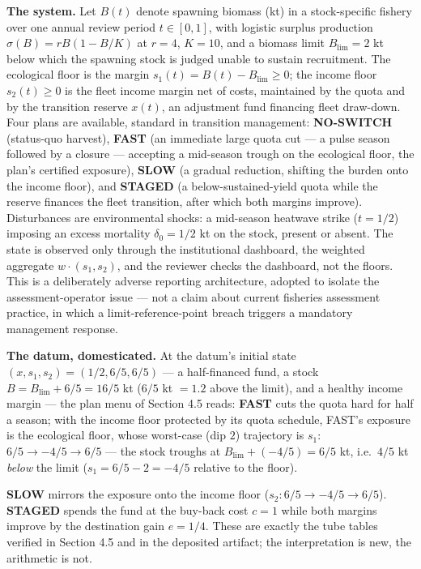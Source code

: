 \documentclass[3p,11pt]{elsarticle}
\begin{document}
\textbf{The system.} Let \(B(t)\) denote spawning biomass (kt) in a
stock-specific fishery over one annual review period \(t \in [0, 1]\), with
logistic surplus production
\(\sigma(B) = r B (1 - B/K)\) at \(r = 4\), \(K = 10\), and a biomass limit
\(B_{\mathrm{lim}} = 2\) kt below which the spawning stock is judged unable
to sustain recruitment. The ecological floor is the margin
\(s_1(t) = B(t) - B_{\mathrm{lim}} \ge 0\); the income floor
\(s_2(t) \ge 0\) is the fleet income margin net of costs, maintained by the
quota and by the transition reserve \(x(t)\), an adjustment fund financing
fleet draw-down. Four plans are available, standard in transition management:
\textbf{NO-SWITCH} (status-quo harvest), \textbf{FAST} (an immediate large
quota cut --- a pulse season followed by a closure --- accepting a
mid-season trough on the ecological floor, the plan's certified
exposure), \textbf{SLOW} (a gradual reduction, shifting the burden onto
the income floor), and \textbf{STAGED} (a
below-sustained-yield quota while the reserve finances the fleet transition,
after which both margins improve). Disturbances are environmental shocks: a
mid-season heatwave strike (\(t = 1/2\)) imposing an excess mortality
\(\delta_0 = 1/2\) kt on the stock, present or absent. The state is observed
only through the institutional dashboard, the weighted aggregate
\(w \cdot (s_1, s_2)\), and the reviewer checks the dashboard, not the
floors. This is a deliberately adverse reporting architecture, adopted to
isolate the assessment-operator issue --- not a claim about current
fisheries assessment practice, in which a limit-reference-point breach
triggers a mandatory management response.

\textbf{The datum, domesticated.} At the datum's initial state
\((x, s_1, s_2) = (1/2, 6/5, 6/5)\) --- a half-financed fund, a stock
\(B = B_{\mathrm{lim}} + 6/5 = 16/5\) kt (\(6/5\) kt \(= 1.2\) above the limit), and a
healthy income margin --- the plan menu of Section 4.5 reads: \textbf{FAST}
cuts the quota hard for half a season; with the income floor protected by its
quota schedule, FAST's exposure is the ecological floor, whose worst-case
(dip \(2\)) trajectory is \(s_1\): \(6/5 \to -4/5 \to 6/5\) --- the stock
troughs at \(B_{\mathrm{lim}} + (-4/5) = 6/5\) kt, i.e.\ \(4/5\) kt
\emph{below} the limit (\(s_1 = 6/5 - 2 = -4/5\) relative to the floor).

\textbf{SLOW} mirrors the exposure onto the income floor
(\(s_2: 6/5 \to -4/5 \to 6/5\)). \textbf{STAGED} spends the fund at the
buy-back cost \(c = 1\) while both margins improve by the destination gain
\(e = 1/4\). These are exactly the tube tables verified in Section 4.5 and
in the deposited artifact; the interpretation is new, the arithmetic is not.
\end{document}
